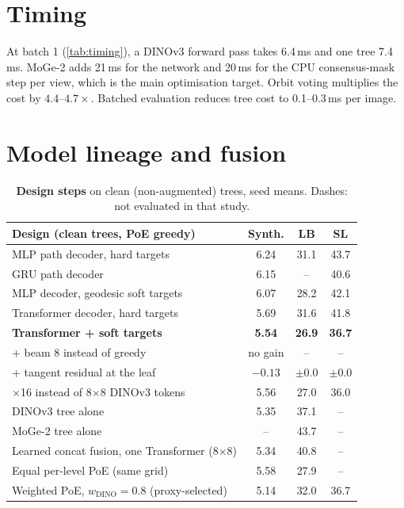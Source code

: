 \clearpage
\setcounter{page}{1}
\maketitlesupplementary
\appendix

\section{Timing}
\label{sec:supp_timing}
\begin{table}[h]
  \centering\small
  
  \caption{\textbf{End-to-end latency} of the augmented trees (shared RTX 6000 Ada; upper bounds; image already decoded).}
  \label{tab:timing}
\end{table}
At batch 1 (\cref{tab:timing}), a DINOv3 forward pass takes 6.4\,ms and one tree 7.4\,ms. MoGe-2 adds 21\,ms for the network and 20\,ms for the CPU consensus-mask step per view, which is the main optimisation target. Orbit voting multiplies the cost by $4.4$--$4.7\times$. Batched evaluation reduces tree cost to 0.1--0.3\,ms per image.

\section{Model lineage and fusion}
\label{sec:supp_lineage}
\begin{table}[h]
  \centering\footnotesize
  \setlength{\tabcolsep}{3pt}
  \begin{tabular}{@{}lccc@{}}
    \toprule
    Design (clean trees, PoE greedy) & Synth. & LB & SL \\
    \midrule
    MLP path decoder, hard targets & 6.24 & 31.1 & 43.7 \\
    GRU path decoder & 6.15 & -- & 40.6 \\
    MLP decoder, geodesic soft targets & 6.07 & 28.2 & 42.1 \\
    Transformer decoder, hard targets & 5.69 & 31.6 & 41.8 \\
    \textbf{Transformer + soft targets} & \textbf{5.54} & \textbf{26.9} & \textbf{36.7} \\
    \quad + beam 8 instead of greedy & no gain & -- & -- \\
    \quad + tangent residual at the leaf & $-0.13$ & $\pm0.0$ & $\pm0.0$ \\
    \quad 16$\times$16 instead of 8$\times$8 DINOv3 tokens & 5.56 & 27.0 & 36.0 \\
    \midrule
    DINOv3 tree alone & 5.35 & 37.1 & -- \\
    MoGe-2 tree alone & -- & 43.7 & -- \\
    Learned concat fusion, one Transformer (8$\times$8) & 5.34 & 40.8 & -- \\
    Equal per-level PoE (same grid) & 5.58 & 27.9 & -- \\
    Weighted PoE, $w_{\text{DINO}}{=}0.8$ (proxy-selected) & 5.14 & 32.0 & 36.7 \\
    \bottomrule
  \end{tabular}
  \caption{\textbf{Design steps} on clean (non-augmented) trees, seed means. Dashes: not evaluated in that study.}
  \label{tab:lineage}
\end{table}

